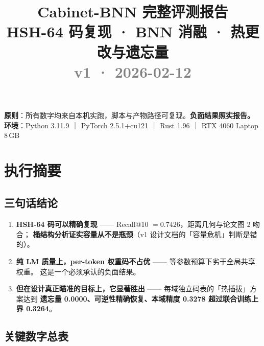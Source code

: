 \documentclass[11pt,a4paper]{ctexart}
\title{\vspace{-1.5cm}\textbf{\color{deepblue}Cabinet-BNN 完整评测报告}\\[4pt]
       \large HSH-64 码复现 · BNN 消融 · 热更改与遗忘量\\[2pt]
       \normalsize \textcolor{gray}{v1 · 2026-02-12}}
\author{}
\date{}
\newcommand{\warn}[1]{\textcolor{warnred}{\textbf{#1}}}
\newcommand{\ok}[1]{\textcolor{okgreen}{\textbf{#1}}}
\begin{document}
\maketitle
\thispagestyle{fancy}

\begin{center}
\begin{minipage}{0.93\textwidth}
\small
\textbf{原则}：所有数字均来自本机实跑，脚本与产物路径可复现。\warn{负面结果照实报告。}\\
\textbf{环境}：Python 3.11.9 ｜ PyTorch 2.5.1+cu121 ｜ Rust 1.96 ｜ RTX 4060 Laptop 8\,GB
\end{minipage}
\end{center}

\vspace{0.3cm}
\tableofcontents
\newpage

\section{执行摘要}

\subsection{三句话结论}

\begin{enumerate}
\item \textbf{HSH-64 码可以精确复现} —— Recall@10 $= 0.7426$，距离几何与论文图 2 吻合；
      \textbf{桶结构分析证实容量从不是瓶颈}（v1 设计文档的「容量危机」判断是错的）。
\item \textbf{纯 LM 质量上，per-token 权重码不占优} —— 等参数预算下劣于全局共享权重。
      这是一个必须承认的负面结果。
\item \textbf{但在设计真正瞄准的目标上，它显著胜出} —— 每域独立码表的「热插拔」方案达到
      \ok{遗忘量 0.0000、可逆性精确恢复、本域精度 0.3278 超过联合训练上界 0.3264}。
\end{enumerate}

\subsection{关键数字总表}
\end{document}
